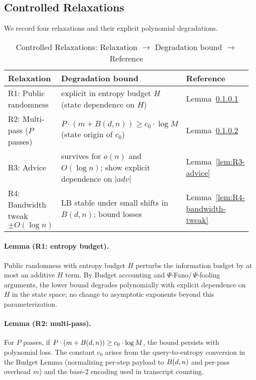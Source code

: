 \subsection{Controlled Relaxations}
We record four relaxations and their explicit polynomial degradations.

\begin{table}[t]
\centering
\begingroup
\small %
\setlength{\tabcolsep}{4.5pt} %
\renewcommand{\arraystretch}{1.05} %
\caption{Controlled Relaxations: Relaxation $\to$ Degradation bound $\to$ Reference}
\begin{tabular}{@{}p{0.24\linewidth}p{0.56\linewidth}p{0.18\linewidth}@{}}
\toprule
Relaxation & Degradation bound & Reference \\
\midrule
R1: Public randomness & explicit in entropy budget $H$ (state dependence on $H$) & Lemma~\ref{lem:R1-entropy-budget} \\
R2: Multi-pass ($P$ passes) & $P\cdot(m+B(d,n)) \ge c_0\cdot \log M$ (state origin of $c_0$) & Lemma~\ref{lem:R2-multipass} \\
R3: Advice & survives for $o(n)$ and $O(\log n)$; show explicit dependence on $|adv|$ & Lemma~\ref{lem:R3-advice} \\
R4: Bandwidth tweak $\pm O(\log n)$ & LB stable under small shifts in $B(d,n)$; bound losses & Lemma~\ref{lem:R4-bandwidth-tweak} \\
\bottomrule
\end{tabular}
\endgroup
\end{table}

\paragraph{Lemma (R1: entropy budget).}\label{lem:R1-entropy-budget}
Public randomness with entropy budget $H$ perturbs the information budget by at most an additive $H$ term. By Budget accounting and $\Psi$-Fano/\,$\Psi$-fooling arguments, the lower bound degrades polynomially with explicit dependence on $H$ in the state space; no change to asymptotic exponents beyond this parameterization.

\paragraph{Lemma (R2: multi-pass).}\label{lem:R2-multipass}
For $P$ passes, if $P\cdot(m+\B(d,n)) \ge c_0\cdot \log M$, the bound persists with polynomial loss. The constant $c_0$ arises from the query-to-entropy conversion in the Budget Lemma (normalizing per-step payload to $\B(d,n)$ and per-pass overhead $m$) and the base-2 encoding used in transcript counting.

